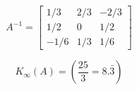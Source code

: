 \[
A^{-1}=\left[
\begin{array}{ccc}
1/3 & 2/3 & -2/3 \\
1/2 & 0 & 1/2\\
-1/6 & 1/3 & 1/6
\end{array}\right]
\]
\bigskip

\[
  K_\infty (A)= \left(
  \frac{25}{3}=8.{\bar{3}} \right)
\]
